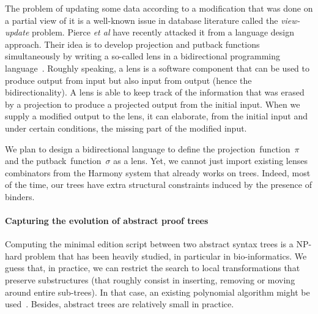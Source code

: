 \documentclass{article}
\newcommand{\remtext}[1]{}
\begin{document}
The problem of updating some data according to a modification that was
done on a partial view of it is a well-known issue in database
literature called the \textit{view-update} problem. Pierce \textit{et
  al} have recently attacked it from a language design approach. Their
idea is to develop projection and putback functions simultaneously by
writing a so-called lens in a bidirectional programming
language~\cite{pierce-bidirectional}. Roughly speaking, a lens is a
software component that can be used to produce output from input but
also input from output (hence the bidirectionality). A lens is able
to keep track of the information that was erased by a projection to
produce a projected output from the initial input. When we supply a
modified output to the lens, it can elaborate, from the initial input
and under certain conditions, the missing part of the modified input. 

We plan to design a bidirectional language to define the
projection~function~$\pi$ and the putback~function~$\sigma$ as a
lens. Yet, we cannot just import existing lenses combinators from the
Harmony system that already works on trees. Indeed, most of the time,
our trees have extra structural constraints induced by the presence of
binders. 

\remtext{Fri Jun 18, 2010 1:46 PM. Autre point important sur les vues
  concrètes~: elles peuvent servir à parler de l'historique.  Voir le
  module MetaAST de l'implémentation. Ces vues sont utiles par exemple
  lorsque l'utilisateur doit construire un patch d'adaptation. Il a
  alors toute la puissance des métathéorèmes ainsi que tous les objets
  déjà construits pour décrire son patch.}

\paragraph{Capturing the evolution of abstract proof trees}
\-

Computing the minimal edition script between two abstract syntax trees
is a NP-hard problem that has been heavily studied, in particular in
bio-informatics.  We guess that, in practice, we can restrict the
search to local transformations that preserve substructures (that
roughly consist in inserting, removing or moving around entire
sub-trees). In that case, an existing polynomial algorithm might be
used~\cite{REF!}. Besides, abstract trees are relatively small in
practice. 
\end{document}

